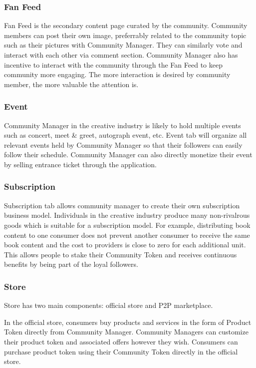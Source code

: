 \documentclass[letterpaper,11pt]{article}
\begin{document}
\subsubsection{Fan Feed}
Fan Feed is the secondary content page curated by the community. Community members can post their own image, preferrably related to the community topic such as their pictures with Community Manager. They can similarly vote and interact with each other via comment section. Community Manager also has incentive to interact with the community through the Fan Feed to keep community more engaging. The more interaction is desired by community member, the more valuable the attention is.

\subsubsection{Event}
Community Manager in the creative industry is likely to hold multiple events such as concert, meet \& greet, autograph event, etc. Event tab will organize all relevant events held by Community Manager so that their followers can easily follow their schedule. Community Manager can also directly monetize their event by selling entrance ticket through the application.

\subsubsection{Subscription}
Subscription tab allows community manager to create their own subscription business model. Individuals in the creative industry produce many non-rivalrous goods which is suitable for a subscription model. For example, distributing book content to one consumer does not prevent another consumer to receive the same book content and the cost to providers is close to zero for each additional unit. This allows people to stake their Community Token and receives continuous benefits by being part of the loyal followers.

\subsubsection{Store}
Store has two main components: official store and P2P marketplace.

In the official store, consumers buy products and services in the form of Product Token directly from Community Manager. Community Managers can customize their product token and associated offers however they wish. Consumers can purchase product token using their Community Token directly in the official store.
\end{document}
